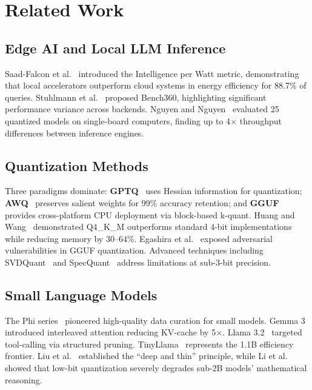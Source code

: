 \documentclass[conference]{IEEEtran}
\begin{document}
\section{Related Work}

\subsection{Edge AI and Local LLM Inference}

Saad-Falcon et al.~\cite{huang2025edge} introduced the Intelligence per Watt metric, demonstrating that local accelerators outperform cloud systems in energy efficiency for 88.7\% of queries. Stuhlmann et al.~\cite{stuhlmann2025bench360} proposed Bench360, highlighting significant performance variance across backends. Nguyen and Nguyen~\cite{nguyen2025sbc} evaluated 25 quantized models on single-board computers, finding up to 4$\times$ throughput differences between inference engines.

\subsection{Quantization Methods}

Three paradigms dominate: \textbf{GPTQ}~\cite{frantar2023gptq} uses Hessian information for quantization; \textbf{AWQ}~\cite{lin2024awq} preserves salient weights for 99\% accuracy retention; and \textbf{GGUF}~\cite{gerganov2023llamacpp} provides cross-platform CPU deployment via block-based k-quant. Huang and Wang~\cite{huang2025edge} demonstrated Q4\_K\_M outperforms standard 4-bit implementations while reducing memory by 30--64\%. Egashira et al.~\cite{egashira2025mindthegap} exposed adversarial vulnerabilities in GGUF quantization. Advanced techniques including SVDQuant~\cite{li2025svdquant} and SpecQuant~\cite{patel2026specquant} address limitations at sub-3-bit precision.

\subsection{Small Language Models}

The Phi series~\cite{phi3, phi4mini} pioneered high-quality data curation for small models. Gemma 3~\cite{gemma3} introduced interleaved attention reducing KV-cache by 5$\times$. Llama 3.2~\cite{llama32} targeted tool-calling via structured pruning. TinyLlama~\cite{zhang2024tinyllama} represents the 1.1B efficiency frontier. Liu et al.~\cite{liu2024mobilellm} established the ``deep and thin'' principle, while Li et al.~\cite{li2026quantization} showed that low-bit quantization severely degrades sub-2B models' mathematical reasoning.
\end{document}
